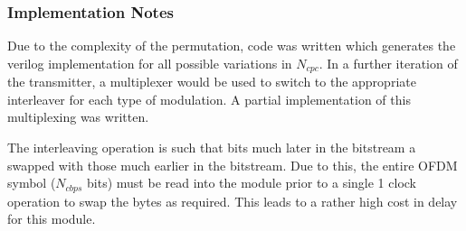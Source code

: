 	\subsubsection{Implementation Notes}

Due to the complexity of the permutation, code was written which generates the verilog implementation for all possible variations in $N_{cpc}$. In a further iteration of the transmitter, a multiplexer would be used to switch to the appropriate interleaver for each type of modulation. A partial implementation of this multiplexing was written.

The interleaving operation is such that bits much later in the bitstream a swapped with those much earlier in the bitstream. Due to this, the entire OFDM symbol ($N_{cbps}$ bits) must be read into the module prior to a single 1 clock operation to swap the bytes as required. This leads to a rather high cost in delay for this module.
